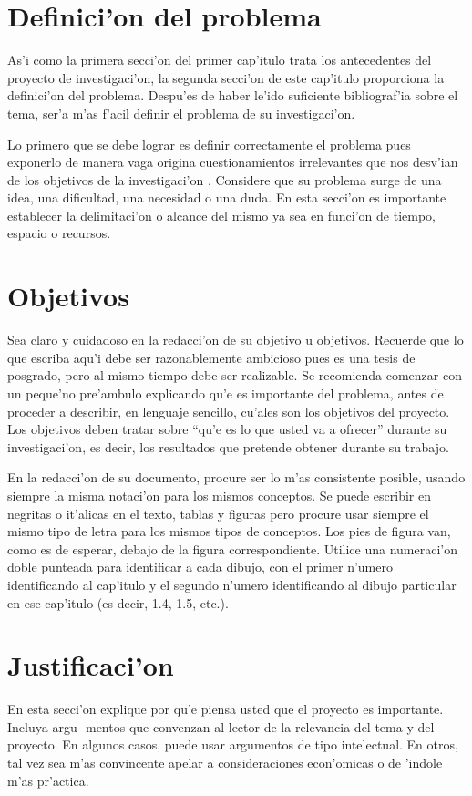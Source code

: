 \section{Definici'on del problema}
\noindent
As'i como la primera secci'on del primer cap'itulo trata los antecedentes del proyecto de investigaci'on, la segunda secci'on de este cap'itulo proporciona la definici'on del problema. Despu'es de haber le'ido suficiente bibliograf'ia sobre el tema, ser'a m'as f'acil definir el problema de su investigaci'on.

Lo primero que se debe lograr es definir correctamente el problema pues exponerlo de manera vaga origina cuestionamientos irrelevantes que nos desv'ian de los objetivos de la investigaci'on \cite{Demo:tesis_autor}. Considere que su problema surge de una idea, una dificultad, una necesidad o una duda. En esta secci'on es importante establecer la delimitaci'on o alcance del mismo ya sea en funci'on de tiempo, espacio o recursos.

\section{Objetivos}
\noindent
Sea claro y cuidadoso en la redacci'on de su objetivo u objetivos. Recuerde que lo que escriba aqu'i debe ser razonablemente ambicioso pues es una tesis de posgrado, pero al mismo tiempo debe ser realizable. Se recomienda comenzar con un peque'no pre'ambulo explicando qu'e es importante del problema, antes de proceder a describir, en lenguaje sencillo, cu'ales son los objetivos del proyecto. Los objetivos deben tratar sobre ``qu'e es lo que usted va a ofrecer'' durante su investigaci'on, es decir, los resultados que pretende obtener durante su trabajo.

En la redacci'on de su documento, procure ser lo m'as consistente posible, usando siempre la misma notaci'on para los mismos conceptos. Se puede escribir en negritas o it'alicas en el texto, tablas y figuras pero procure usar siempre el mismo tipo de letra para los mismos tipos de conceptos. Los pies de figura van, como es de esperar, debajo de la figura correspondiente. Utilice una numeraci'on doble punteada para identificar a cada dibujo, con el primer n'umero identificando al cap'itulo y el segundo n'umero identificando al dibujo particular en ese cap'itulo (es decir, 1.4, 1.5, etc.).

\section{Justificaci'on}
\noindent
En esta secci'on explique por qu'e piensa usted que el proyecto es importante. Incluya argu- mentos que convenzan al lector de la relevancia del tema y del proyecto. En algunos casos, puede usar argumentos de tipo intelectual. En otros, tal vez sea m'as convincente apelar a consideraciones econ'omicas o de 'indole m'as pr'actica.

